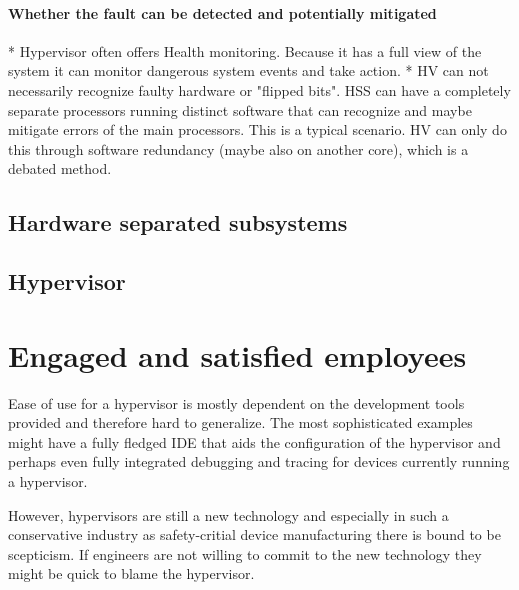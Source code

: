 \paragraph{Whether the fault can be detected and potentially mitigated}
* Hypervisor often offers Health monitoring. Because it has a full view of the system it can monitor dangerous system events and take action.
* HV can not necessarily recognize faulty hardware or "flipped bits". HSS can have a completely separate processors running distinct software that can recognize and maybe mitigate errors of the main processors. This is a typical scenario. HV can only do this through software redundancy (maybe also on another core), which is a debated method.

\subsection{Hardware separated subsystems}
\subsection{Hypervisor}


\section{Engaged and satisfied employees}
Ease of use for a hypervisor is mostly dependent on the development tools provided and therefore hard to generalize. The most sophisticated examples might have a fully fledged \gls{IDE} that aids the configuration of the hypervisor and perhaps even fully integrated debugging and tracing for devices currently running a hypervisor. %

However, hypervisors are still a new technology and especially in such a conservative industry as safety-critial device manufacturing there is bound to be scepticism. If engineers are not willing to commit to the new technology they might be quick to blame the hypervisor.


